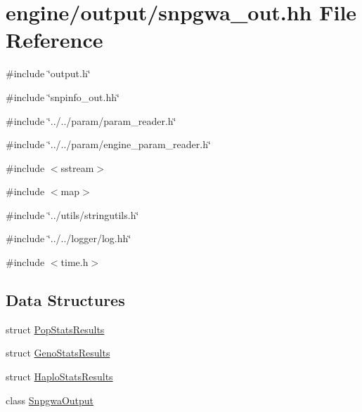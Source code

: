 \hypertarget{snpgwa__out_8hh}{
\section{engine/output/snpgwa\_\-out.hh File Reference}
\label{snpgwa__out_8hh}
}
{\ttfamily \#include \char`\"{}output.h\char`\"{}}\par
{\ttfamily \#include \char`\"{}snpinfo\_\-out.hh\char`\"{}}\par
{\ttfamily \#include \char`\"{}../../param/param\_\-reader.h\char`\"{}}\par
{\ttfamily \#include \char`\"{}../../param/engine\_\-param\_\-reader.h\char`\"{}}\par
{\ttfamily \#include $<$sstream$>$}\par
{\ttfamily \#include $<$map$>$}\par
{\ttfamily \#include \char`\"{}../utils/stringutils.h\char`\"{}}\par
{\ttfamily \#include \char`\"{}../../logger/log.hh\char`\"{}}\par
{\ttfamily \#include $<$time.h$>$}\par
\subsection*{Data Structures}
\begin{DoxyCompactItemize}
\item 
struct \hyperlink{structPopStatsResults}{PopStatsResults}
\item 
struct \hyperlink{structGenoStatsResults}{GenoStatsResults}
\item 
struct \hyperlink{structHaploStatsResults}{HaploStatsResults}
\item 
class \hyperlink{classSnpgwaOutput}{SnpgwaOutput}
\end{DoxyCompactItemize}
